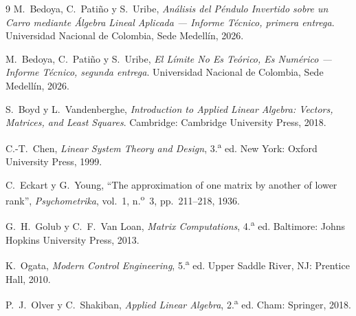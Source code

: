 \documentclass[11pt,letterpaper]{article}
\begin{document}
\begin{thebibliography}{9}
\small
{}
M.~Bedoya, C.~Patiño y S.~Uribe, \emph{Análisis del Péndulo Invertido sobre un
Carro mediante Álgebra Lineal Aplicada --- Informe Técnico, primera entrega}.
Universidad Nacional de Colombia, Sede Medellín, 2026.

M.~Bedoya, C.~Patiño y S.~Uribe, \emph{El Límite No Es Teórico, Es Numérico ---
Informe Técnico, segunda entrega}. Universidad Nacional de Colombia, Sede
Medellín, 2026.

S.~Boyd y L.~Vandenberghe, \emph{Introduction to Applied Linear Algebra:
Vectors, Matrices, and Least Squares}. Cambridge: Cambridge University Press,
2018.

C.-T.~Chen, \emph{Linear System Theory and Design}, 3.\textsuperscript{a} ed.
New York: Oxford University Press, 1999.

C.~Eckart y G.~Young, ``The approximation of one matrix by another of lower
rank'', \emph{Psychometrika}, vol.~1, n.\textsuperscript{o}~3, pp.~211--218, 1936.

G.~H.~Golub y C.~F.~Van Loan, \emph{Matrix Computations},
4.\textsuperscript{a} ed. Baltimore: Johns Hopkins University Press, 2013.

K.~Ogata, \emph{Modern Control Engineering}, 5.\textsuperscript{a} ed.
Upper Saddle River, NJ: Prentice Hall, 2010.

P.~J.~Olver y C.~Shakiban, \emph{Applied Linear Algebra},
2.\textsuperscript{a} ed. Cham: Springer, 2018.

\end{thebibliography}
\end{document}
